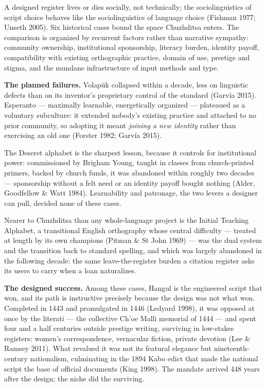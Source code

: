 \documentclass[11pt]{article}
\begin{document}
A designed register lives or dies socially, not technically; the sociolinguistics of script choice behaves like the sociolinguistics of language choice (Fishman 1977; Unseth 2005). Six historical cases bound the space Chuzhditsa enters. The comparison is organized by recurrent factors rather than narrative sympathy: community ownership, institutional sponsorship, literacy burden, identity payoff, compatibility with existing orthographic practice, domain of use, prestige and stigma, and the mundane infrastructure of input methods and type.

\textbf{The planned failures.} Volap\"uk collapsed within a decade, less on linguistic defects than on its inventor's proprietary control of the standard (Garv\'ia 2015). Esperanto — maximally learnable, energetically organized — plateaued as a voluntary subculture: it extended nobody's existing practice and attached to no prior community, so adopting it meant \emph{joining a new identity} rather than exercising an old one (Forster 1982; Garv\'ia 2015).

The Deseret alphabet is the sharpest lesson, because it controls for institutional power: commissioned by Brigham Young, taught in classes from church-printed primers, backed by church funds, it was abandoned within roughly two decades — sponsorship without a felt need or an identity payoff bought nothing (Alder, Goodfellow \& Watt 1984). Learnability and patronage, the two levers a designer can pull, decided none of these cases.

Nearer to Chuzhditsa than any whole-language project is the Initial Teaching Alphabet, a transitional English orthography whose central difficulty — treated at length by its own champions (Pitman \& St John 1969) — was the dual system and the transition back to standard spelling, and which was largely abandoned in the following decade: the same leave-the-register burden a citation register asks its users to carry when a loan naturalizes.

\textbf{The designed success.} Among these cases, Hangul is the engineered script that won, and its path is instructive precisely because the design was not what won. Completed in 1443 and promulgated in 1446 (Ledyard 1998), it was opposed at once by the literati — the collective Ch'oe Malli memorial of 1444 — and spent four and a half centuries outside prestige writing, surviving in low-stakes registers: women's correspondence, vernacular fiction, private devotion (Lee \& Ramsey 2011). What revalued it was not its featural elegance but nineteenth-century nationalism, culminating in the 1894 Kabo edict that made the national script the base of official documents (King 1998). The mandate arrived 448 years after the design; the niche did the surviving.
\end{document}
